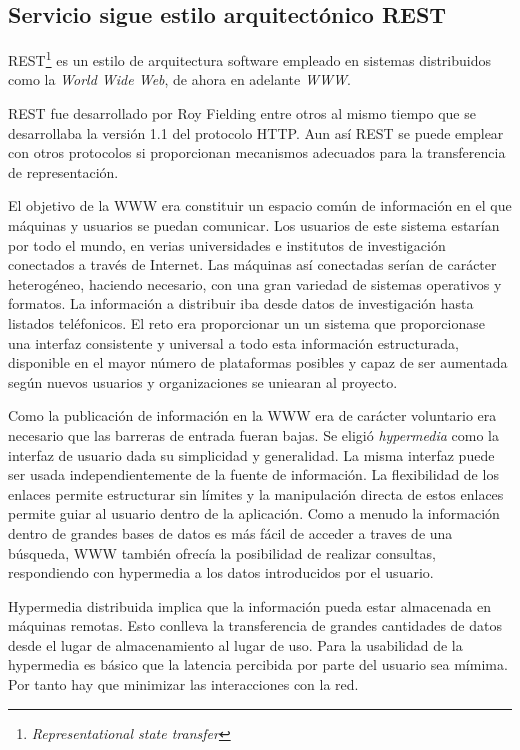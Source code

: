 \subsection{Servicio sigue estilo arquitectónico REST}
REST\footnote{\emph{Representational state transfer}} es un estilo de
arquitectura software empleado en sistemas distribuidos como la
\emph{World Wide Web}, de ahora en adelante \emph{WWW}.

REST fue desarrollado por Roy Fielding entre otros al mismo tiempo que
se desarrollaba la versión 1.1 del protocolo HTTP. Aun así REST se
puede emplear con otros protocolos si proporcionan mecanismos
adecuados para la transferencia de representación.

El objetivo de la WWW era constituir un espacio común de información
en el que máquinas y usuarios se puedan comunicar.  Los usuarios de
este sistema estarían por todo el mundo, en verias universidades e
institutos de investigación conectados a través de Internet. Las
máquinas así conectadas serían de carácter heterogéneo, haciendo
necesario, con una gran variedad de sistemas operativos y formatos. La
información a distribuir iba desde datos de investigación hasta
listados teléfonicos. El reto era proporcionar un un sistema que
proporcionase una interfaz consistente y universal a todo esta
información estructurada, disponible en el mayor número de plataformas
posibles y capaz de ser aumentada según nuevos usuarios y
organizaciones se uniearan al proyecto.

Como la publicación de información en la WWW era de carácter
voluntario era necesario que las barreras de entrada fueran bajas. Se
eligió \emph{hypermedia} como la interfaz de usuario dada su
simplicidad y generalidad. La misma interfaz puede ser usada
independientemente de la fuente de información. La flexibilidad de los
enlaces permite estructurar sin límites y la manipulación directa de
estos enlaces permite guiar al usuario dentro de la aplicación. Como a
menudo la información dentro de grandes bases de datos es más fácil de
acceder a traves de una búsqueda, WWW también ofrecía la posibilidad
de realizar consultas, respondiendo con hypermedia a los datos
introducidos por el usuario.

Hypermedia distribuida implica que la información pueda estar
almacenada en máquinas remotas. Esto conlleva la transferencia de
grandes cantidades de datos desde el lugar de almacenamiento al lugar
de uso. Para la usabilidad de la hypermedia es básico que la latencia
percibida por parte del usuario sea mímima. Por tanto hay que
minimizar las interacciones con la red.

